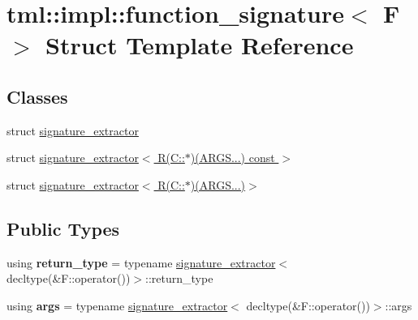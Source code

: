 \hypertarget{structtml_1_1impl_1_1function__signature}{\section{tml\+:\+:impl\+:\+:function\+\_\+signature$<$ F $>$ Struct Template Reference}
\label{structtml_1_1impl_1_1function__signature}
}
\subsection*{Classes}
\begin{DoxyCompactItemize}
\item 
struct \hyperlink{structtml_1_1impl_1_1function__signature_1_1signature__extractor}{signature\+\_\+extractor}
\item 
struct \hyperlink{structtml_1_1impl_1_1function__signature_1_1signature__extractor_3_01_r_07_c_1_1_5_08_07_a_r_g_s_8_8_8_08_01const_01_01_4}{signature\+\_\+extractor$<$ R(\+C\+::$\ast$)(\+A\+R\+G\+S...) const  $>$}
\item 
struct \hyperlink{structtml_1_1impl_1_1function__signature_1_1signature__extractor_3_01_r_07_c_1_1_5_08_07_a_r_g_s_8_8_8_08_4}{signature\+\_\+extractor$<$ R(\+C\+::$\ast$)(\+A\+R\+G\+S...)$>$}
\end{DoxyCompactItemize}
\subsection*{Public Types}
\begin{DoxyCompactItemize}
\item 
\hypertarget{structtml_1_1impl_1_1function__signature_ae3dad047c3a9612218fbd9964dc8d839}{using {\bfseries return\+\_\+type} = typename \hyperlink{structtml_1_1impl_1_1function__signature_1_1signature__extractor}{signature\+\_\+extractor}$<$ decltype(\&F\+::operator())$>$\+::return\+\_\+type}\label{structtml_1_1impl_1_1function__signature_ae3dad047c3a9612218fbd9964dc8d839}

\item 
\hypertarget{structtml_1_1impl_1_1function__signature_ad5c5c13ba6252447c7eefa5d126d2ff8}{using {\bfseries args} = typename \hyperlink{structtml_1_1impl_1_1function__signature_1_1signature__extractor}{signature\+\_\+extractor}$<$ decltype(\&F\+::operator())$>$\+::args}\label{structtml_1_1impl_1_1function__signature_ad5c5c13ba6252447c7eefa5d126d2ff8}

\end{DoxyCompactItemize}
